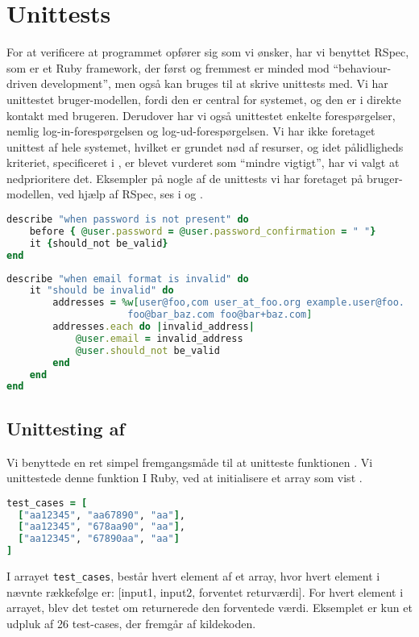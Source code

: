 \section{Unittests}
\label{sec:unittests}
For at verificere at programmet opfører sig som vi ønsker, har vi benyttet RSpec, som er et Ruby framework, der først og fremmest er minded mod ``behaviour-driven development'', men også kan bruges til at skrive unittests med. Vi har unittestet bruger-modellen, fordi den er central for systemet, og den er i direkte kontakt med brugeren. Derudover har vi også unittestet enkelte forespørgelser, nemlig log-in-forespørgelsen og log-ud-forespørgelsen. Vi har ikke foretaget unittest af hele systemet, hvilket er grundet nød af resurser, og idet pålidligheds kriteriet, specificeret i , er blevet vurderet som ``mindre vigtigt'', har vi valgt at nedprioritere det. Eksempler på nogle af de unittests vi har foretaget på bruger-modellen, ved hjælp af RSpec, ses i  og .

\begin{lstlisting}[caption={Et eksempel på unittesting af, om brugeren har indtastet et password, når han/hun opretter sig som bruger},label=lst:password,language=Ruby]
describe "when password is not present" do
    before { @user.password = @user.password_confirmation = " "}
    it {should_not be_valid}
end
\end{lstlisting}

\begin{lstlisting}[caption={Et eksempel på unittesting af, om en brugers email er valid, når han/hun opretter sig som bruger},label=lst:email,language=Ruby]
describe "when email format is invalid" do
	it "should be invalid" do
    	addresses = %w[user@foo,com user_at_foo.org example.user@foo.
                 	 foo@bar_baz.com foo@bar+baz.com]
    	addresses.each do |invalid_address|
    		@user.email = invalid_address
        	@user.should_not be_valid
    	end
    end
end
\end{lstlisting}

\subsection{Unittesting af }
Vi benyttede en ret simpel fremgangsmåde til at unitteste funktionen . Vi unittestede denne funktion I Ruby, ved at initialisere et array som vist .

\begin{lstlisting}[caption={Et eksempel på en række testcases til brug ved unittesting.},label=lst:testcases,language=Ruby]
test_cases = [
  ["aa12345", "aa67890", "aa"],
  ["aa12345", "678aa90", "aa"],
  ["aa12345", "67890aa", "aa"]
]
\end{lstlisting}

I arrayet \texttt{test\_cases}, består hvert element af et array, hvor hvert element i nævnte rækkefølge er: [input1, input2, forventet returværdi].
For hvert element i arrayet, blev det testet om  returnerede den forventede værdi. Eksemplet er kun et udpluk af 26 test-cases, der fremgår af kildekoden.

